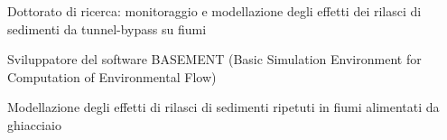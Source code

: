\begin{tightemize}
\item Dottorato di ricerca: monitoraggio e modellazione degli effetti dei rilasci di sedimenti da tunnel-bypass su fiumi
\item Sviluppatore del software BASEMENT (Basic Simulation Environment for Computation of Environmental Flow)
\end{tightemize}
\sectionsep

\begin{tightemize}
\item Modellazione degli effetti di rilasci di sedimenti ripetuti in fiumi alimentati da ghiacciaio
\end{tightemize}
\sectionsep
